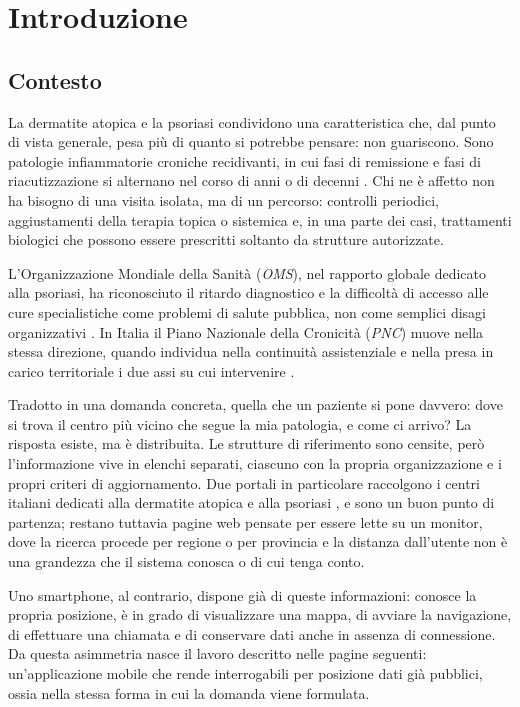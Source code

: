 \chapter{Introduzione}\label{ch:introduzione}

\section{Contesto}\label{sec:contesto}

La dermatite atopica e la psoriasi condividono una caratteristica che, dal punto di vista generale, pesa più di quanto
si potrebbe pensare: non guariscono.
Sono patologie infiammatorie croniche recidivanti, in cui fasi di remissione e fasi di riacutizzazione si alternano nel
corso di anni o di decenni \cite{weidingerAD, griffithsPsoriasis}.
Chi ne è affetto non ha bisogno di una visita isolata, ma di un percorso: controlli periodici, aggiustamenti della terapia
topica o sistemica e, in una parte dei casi, trattamenti biologici che possono essere prescritti soltanto da strutture autorizzate.

L'Organizzazione Mondiale della Sanità (\textit{OMS}), nel rapporto globale dedicato alla psoriasi, ha riconosciuto
il ritardo diagnostico e la difficoltà di accesso alle cure specialistiche come problemi di salute pubblica,
non come semplici disagi organizzativi \cite{whoPsoriasis}.
In Italia il Piano Nazionale della Cronicità (\textit{PNC}) muove nella stessa direzione, quando individua nella continuità
assistenziale e nella presa in carico territoriale i due assi su cui intervenire \cite{pianoCronicita}.

Tradotto in una domanda concreta, quella che un paziente si pone davvero: dove si trova il centro più vicino che segue la
mia patologia, e come ci arrivo?
La risposta esiste, ma è distribuita.
Le strutture di riferimento sono censite, però l'informazione vive in elenchi separati, ciascuno con la propria organizzazione
e i propri criteri di aggiornamento.
Due portali in particolare raccolgono i centri italiani dedicati alla dermatite atopica e alla psoriasi \cite{dermatopia, viciniDiPelle},
e sono un buon punto di partenza;
restano tuttavia pagine web pensate per essere lette su un monitor, dove la ricerca procede per regione o per provincia e la
distanza dall'utente non è una grandezza che il sistema conosca o di cui tenga conto.

Uno smartphone, al contrario, dispone già di queste informazioni: conosce la propria posizione,
è in grado di visualizzare una mappa, di avviare la navigazione, di effettuare una chiamata e di conservare dati anche in assenza
di connessione.
Da questa asimmetria nasce il lavoro descritto nelle pagine seguenti: un'applicazione mobile che rende interrogabili per posizione
dati già pubblici, ossia nella stessa forma in cui la domanda viene formulata.


